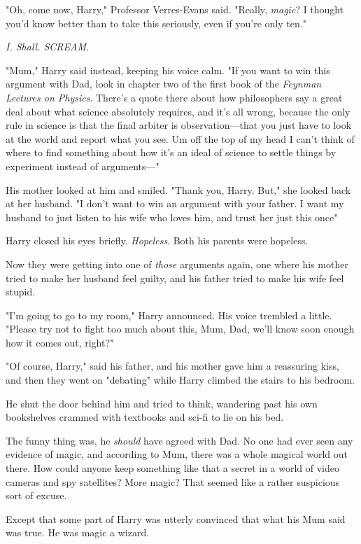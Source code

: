 "Oh, come now, Harry," Professor Verres-Evans said.
"Really, \emph{magic}? I thought you'd know better than to take
this seriously, even if you're only ten."

\emph{I. Shall. SCREAM.}

"Mum," Harry said instead, keeping his voice calm. "If you
want to win this argument with Dad, look in chapter two
of the first book of the \emph{Feynman Lectures on Physics}.
There's a quote there about how philosophers say a great
deal about what science absolutely requires, and it's all
wrong, because the only rule in science is that the final
arbiter is observation—that you just have to look at the
world and report what you see. Um{\el} off the top of my
head I can't think of where to find something about how
it's an ideal of science to settle things by experiment
instead of arguments—"

His mother looked at him and smiled. "Thank you, Harry.
But," she looked back at her husband. "I don't want to
win an argument with your father. I want my husband to
just{\el} listen to his wife who loves him, and trust her just
this once{\el}"

Harry closed his eyes briefly. \emph{Hopeless}. Both his parents
were hopeless.

Now they were getting into one of \emph{those} arguments again,
one where his mother tried to make her husband feel
guilty, and his father tried to make his wife feel stupid.

"I'm going to go to my room," Harry announced. His voice
trembled a little. "Please try not to fight too much about
this, Mum, Dad, we'll know soon enough how it comes out, right?"

"Of course, Harry," said his father, and his mother gave
him a reassuring kiss, and then they went on "debating"
while Harry climbed the stairs to his bedroom.

He shut the door behind him and tried to think, wandering
past his own bookshelves crammed with textbooks and
sci-fi to lie on his bed.

The funny thing was, he \emph{should} have agreed with Dad. No
one had ever seen any evidence of magic, and according
to Mum, there was a whole magical world out there. How
could anyone keep something like that a secret in a world
of video cameras and spy satellites? More magic? That
seemed like a rather suspicious sort of excuse.

Except that some part of Harry was utterly convinced that
what his Mum said was true. He was magic{\el} a wizard.

